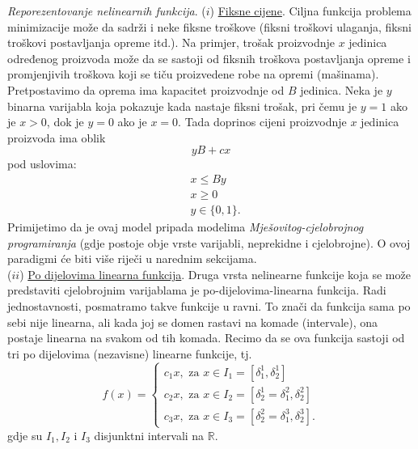 \documentclass[a4paper, utf8, 11pt, colorlinks]{article}
\begin{document}
\emph{Reporezentovanje nelinearnih funkcija}. ($i$) \underline{Fiksne cijene}. Ciljna funkcija problema minimizacije može da sadrži i neke fiksne troškove (fiksni troškovi ulaganja, fiksni troškovi postavljanja opreme itd.). Na primjer, trošak proizvodnje $x$ jedinica određenog proizvoda može da se sastoji od fiksnih troškova postavljanja opreme i promjenjivih troškova koji se tiču proizvedene robe na opremi (mašinama). Pretpostavimo da oprema ima kapacitet proizvodnje od $B$ jedinica. Neka je $y$ binarna varijabla koja pokazuje kada nastaje fiksni trošak, pri čemu  je $y=1$ ako je $x >0$, dok je $y=0$ ako je $x=0$. Tada doprinos cijeni proizvodnje $x$ jedinica proizvoda ima oblik 
$$ yB + c x $$ pod uslovima:
\begin{align}
     &x \leq By \\
     & x \geq 0 \\
     & y \in \{0, 1\}.
\end{align}
Primijetimo da je ovaj model pripada modelima \emph{Mješovitog-cjelobrojnog programiranja} (gdje postoje obje vrste varijabli, neprekidne i cjelobrojne). O ovoj paradigmi će biti više riječi u narednim sekcijama. \\
($ii$) \underline{{Po dijelovima linearna funkcija}}. Druga vrsta nelinearne funkcije koja se može predstaviti cjelobrojnim varijablama je po-dijelovima-linearna funkcija. Radi jednostavnosti, posmatramo takve funkcije u ravni. To znači da funkcija sama po sebi nije linearna, ali kada joj se domen rastavi na komade (intervale), ona postaje linearna na svakom od tih komada. Recimo da se ova funkcija sastoji od tri po dijelovima (nezavisne) linearne funkcije, tj. 
$$f(x) = \begin{cases}
          c_1 x, \mbox{ za } x \in I_1 = [\delta^1_1, \delta^1_2] \\
          c_2 x, \mbox{ za } x \in I_2 = [\delta^1_2 = \delta^2_1, \delta^2_2] \\
          c_3 x, \mbox{ za } x \in I_3 = [\delta^2_2 = \delta^3_1, \delta^3_2].
      \end{cases}
$$
gdje su $I_1, I_2$ i $I_3$ disjunktni intervali na $\mathbb{R}$.
\end{document}
